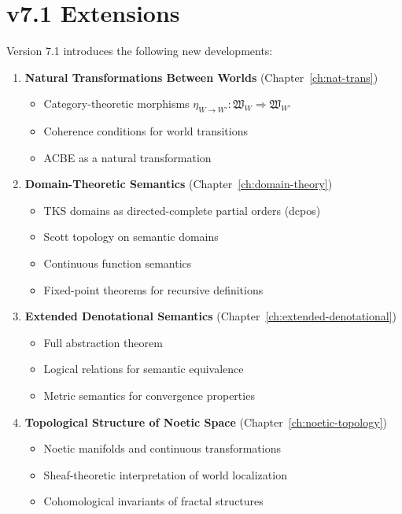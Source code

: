 \documentclass[11pt,twoside,openright]{book}
\theoremstyle{definition}
\theoremstyle{plain}
\theoremstyle{remark}
\newcommand{\WorldFunctor}[1]{\mathfrak{W}_{#1}}
\begin{document}
\section*{v7.1 Extensions}

Version 7.1 introduces the following new developments:

\begin{enumerate}
  \item \textbf{Natural Transformations Between Worlds} (Chapter~\ref{ch:nat-trans})
  \begin{itemize}
    \item Category-theoretic morphisms $\eta_{W \to W'} : \WorldFunctor{W} \Rightarrow \WorldFunctor{W'}$
    \item Coherence conditions for world transitions
    \item ACBE as a natural transformation
  \end{itemize}

  \item \textbf{Domain-Theoretic Semantics} (Chapter~\ref{ch:domain-theory})
  \begin{itemize}
    \item TKS domains as directed-complete partial orders (dcpos)
    \item Scott topology on semantic domains
    \item Continuous function semantics
    \item Fixed-point theorems for recursive definitions
  \end{itemize}

  \item \textbf{Extended Denotational Semantics} (Chapter~\ref{ch:extended-denotational})
  \begin{itemize}
    \item Full abstraction theorem
    \item Logical relations for semantic equivalence
    \item Metric semantics for convergence properties
  \end{itemize}

  \item \textbf{Topological Structure of Noetic Space} (Chapter~\ref{ch:noetic-topology})
  \begin{itemize}
    \item Noetic manifolds and continuous transformations
    \item Sheaf-theoretic interpretation of world localization
    \item Cohomological invariants of fractal structures
  \end{itemize}
\end{enumerate}
\end{document}
